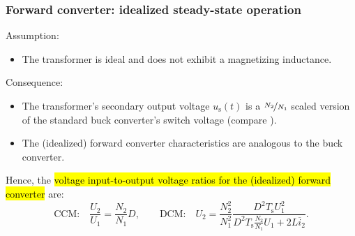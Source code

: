 \begin{frame}[fragile]
\begin{figure}
	\end{figure}
\end{frame}

\begin{frame}
	\frametitle{Forward converter: idealized steady-state operation}
	Assumption:
	\begin{itemize}
		\item The transformer is ideal and does not exhibit a magnetizing inductance.
	\end{itemize}\pause
	Consequence:
	\begin{itemize}
		\item The transformer's secondary output voltage $u_\mathrm{s}(t)$ is a $\nicefrac{N_2}{N_1}$ scaled version of the standard buck converter's switch voltage (compare ). \pause
		\item The (idealized) forward converter characteristics are analogous to the buck converter.
	\end{itemize} \pause
	Hence, the \hl{voltage input-to-output voltage ratios for the (idealized) forward converter} are:
	\begin{equation}
		\mbox{CCM:}\quad \frac{U_2}{U_1} = \frac{N_2}{N_1}D, \qquad \mbox{DCM:}\quad U_2 = \frac{N_2^2}{N_1^2}\frac{D^2T_\mathrm{s}U_1^2}{D^2T_\mathrm{s}\frac{N_2}{N_1}U_1+2L\overline{i}_2}.
	\end{equation}
\end{frame}

